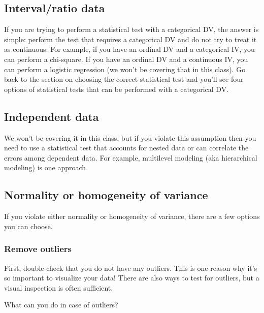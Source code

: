 \documentclass[
]{book}
\begin{document}
\hypertarget{intervalratio-data-1}{%
\subsection{Interval/ratio data}\label{intervalratio-data-1}}

If you are trying to perform a statistical test with a categorical DV, the answer is simple: perform the test that requires a categorical DV and do not try to treat it as continuous. For example, if you have an ordinal DV and a categorical IV, you can perform a chi-square. If you have an ordinal DV and a continuous IV, you can perform a logistic regression (we won't be covering that in this class). Go back to the section on choosing the correct statistical test and you'll see four options of statistical tests that can be performed with a categorical DV.

\hypertarget{independent-data}{%
\subsection{Independent data}\label{independent-data}}

We won't be covering it in this class, but if you violate this assumption then you need to use a statistical test that accounts for nested data or can correlate the errors among dependent data. For example, multilevel modeling (aka hierarchical modeling) is one approach.

\hypertarget{normality-or-homogeneity-of-variance}{%
\subsection{Normality or homogeneity of variance}\label{normality-or-homogeneity-of-variance}}

If you violate either normality or homogeneity of variance, there are a few options you can choose.

\hypertarget{remove-outliers}{%
\subsubsection{Remove outliers}\label{remove-outliers}}

First, double check that you do not have any outliers. This is one reason why it's so important to visualize your data! There are also ways to test for outliers, but a visual inspection is often sufficient.

What can you do in case of outliers?
\end{document}
